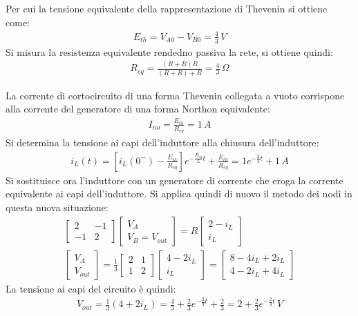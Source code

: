 \documentclass{article}
\begin{document}
Per cui la tensione equivalente della rappresentazione di Thevenin si ottiene come:
\begin{gather*}
    E_{th}=V_{A0}-V_{B0}=\displaystyle\frac{4}{3}\,V
\end{gather*}
Si misura la resistenza equivalente rendedno passiva la rete, si ottiene quindi:
\begin{gather*}
    R_{eq}=\displaystyle\frac{(R+R)R}{(R+R)+R}=\frac{4}{3}\,\Omega
\end{gather*}

La corrente di cortocircuito di una forma Thevenin collegata a vuoto corrispone alla corrente del generatore di una forma Northon equivalente:
\begin{gather*}
    I_{no}=\displaystyle\frac{E_{th}}{R_{eq}}=1\,A
\end{gather*}
Si determina la tensione ai capi dell'induttore alla chiusura dell'induttore: 
\begin{gather*}
    i_L(t)=\left[\displaystyle i_L(0^-)-\frac{E_{th}}{R_{eq}}\right]e^{-\frac{R_{eq}}{L}t}+\frac{E_{th}}{R_{eq}}=1e^{-\frac{2}{3}t}+1\,A
\end{gather*}
Si sostituisce ora l'induttore con un generatore di corrente che eroga la corrente equivalente ai capi dell'induttore. Si applica quindi di nuovo il metodo dei nodi in questa 
nuova situazione:
\begin{gather*}
    \begin{bmatrix}
        2&-1\\-1&2
    \end{bmatrix}\begin{bmatrix}
        V_{A}\\V_{B}=V_{out}
    \end{bmatrix}=
    R\begin{bmatrix}
        2-i_L\\i_L
    \end{bmatrix}\\
    \begin{bmatrix}
        V_{A}\\V_{out}
    \end{bmatrix}=\displaystyle\frac{1}{3}
    \begin{bmatrix}
        2&1\\1&2
    \end{bmatrix}\begin{bmatrix}
        4-2i_L\\i_L
    \end{bmatrix}=\begin{bmatrix}
        8-4i_L+2i_L\\
        4-2i_L+4i_L
    \end{bmatrix}
\end{gather*}
La tensione ai capi del circuito è quindi: 
\begin{gather}
    V_{out}=\displaystyle\frac{1}{3}\left(4+2i_L\right)=\frac{4}{3}+\frac{2}{3}e^{-\frac{2}{3}t}+\frac{2}{3}=2+\frac{2}{3}e^{-\frac{2}{3}t}\,V
\end{gather}
\end{document}
